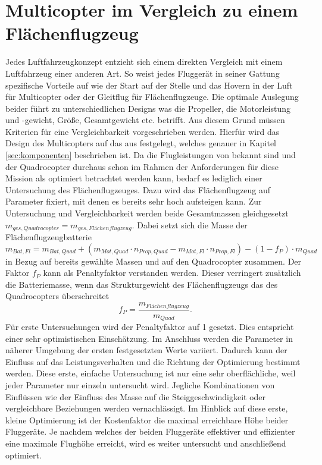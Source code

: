 \section{Multicopter im Vergleich zu einem Flächenflugzeug}
\label{sec:multicopter_vs_flaechenflugzeug}
Jedes Luftfahrzeugkonzept entzieht sich einem direkten Vergleich mit einem Luftfahrzeug einer anderen Art. So weist jedes Fluggerät in seiner Gattung spezifische Vorteile auf wie der Start auf der Stelle und das Hovern in der Luft für Multicopter oder der Gleitflug für Flächenflugzeuge. Die optimale Auslegung beider führt zu unterschiedlichen Designs was die Propeller, die Motorleistung und -gewicht, Größe, Gesamtgewicht etc. betrifft. Aus diesem Grund müssen Kriterien für eine Vergleichbarkeit vorgeschrieben werden. Hierfür wird das Design des Multicopters auf das aus \cite{Anderson.2018} festgelegt, welches genauer in Kapitel \ref{sec:komponenten} beschrieben ist. Da die Flugleistungen von \cite{Anderson.2018} bekannt sind und der Quadrocopter durchaus schon im Rahmen der Anforderungen für diese Mission als optimiert betrachtet werden kann, bedarf es lediglich einer Untersuchung des Flächenflugzeuges. Dazu wird das Flächenflugzeug auf Parameter fixiert, mit denen es bereits sehr hoch aufsteigen kann. Zur Untersuchung und Vergleichbarkeit werden beide Gesamtmassen gleichgesetzt \ensuremath{m_{ges,Quadrocopter} = m_{ges,Flächenflugzeug}}. Dabei setzt sich die Masse der Flächenflugzeugbatterie   
\begin{equation}
	m_{Bat,Fl} = m_{Bat,Quad} + (m_{Mot,Quad}\cdot n_{Prop,Quad} - m_{Mot,Fl}\cdot n_{Prop,Fl}) - (1-f_P)\cdot m_{Quad}  
\end{equation}
in Bezug auf bereits gewählte Massen und auf den Quadrocopter zusammen. Der Faktor \ensuremath{f_P} kann als Penaltyfaktor verstanden werden. Dieser verringert zusätzlich die Batteriemasse, wenn das Strukturgewicht des Flächenflugzeugs das des Quadrocopters überschreitet
\begin{equation}
	f_P = \frac{m_{Flächenflugzeug}}{m_{Quad}}.
\end{equation} 
Für erste Untersuchungen wird der Penaltyfaktor auf 1 gesetzt. Dies entspricht einer sehr optimistischen Einschätzung. Im Anschluss werden die Parameter in näherer Umgebung der ersten festgesetzten Werte variiert. Dadurch kann der Einfluss auf das Leistungsverhalten und die Richtung der Optimierung bestimmt werden. Diese erste, einfache Untersuchung ist nur eine sehr oberflächliche, weil jeder Parameter nur einzeln untersucht wird. Jegliche Kombinationen von Einflüssen wie der Einfluss des Masse auf die Steiggeschwindigkeit oder vergleichbare Beziehungen werden vernachlässigt. Im Hinblick auf diese erste, kleine Optimierung ist der Kostenfaktor die maximal erreichbare Höhe beider Fluggeräte. Je nachdem welches der beiden Fluggeräte effektiver und effizienter eine maximale Flughöhe erreicht, wird es weiter untersucht und anschließend optimiert. 


